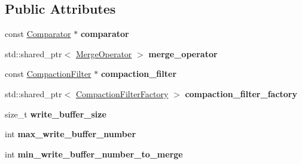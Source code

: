 \subsection*{Public Attributes}
\begin{DoxyCompactItemize}
\item 
const \hyperlink{classrocksdb_1_1Comparator}{Comparator} $\ast$ {\bfseries comparator}\hypertarget{structrocksdb_1_1ColumnFamilyOptions_adfb6e7d3c9eaa25910a00d5c3f62db4b}{}\label{structrocksdb_1_1ColumnFamilyOptions_adfb6e7d3c9eaa25910a00d5c3f62db4b}

\item 
std\+::shared\+\_\+ptr$<$ \hyperlink{classrocksdb_1_1MergeOperator}{Merge\+Operator} $>$ {\bfseries merge\+\_\+operator}\hypertarget{structrocksdb_1_1ColumnFamilyOptions_ac5b3c36f2f0f1bf0332b96a650747710}{}\label{structrocksdb_1_1ColumnFamilyOptions_ac5b3c36f2f0f1bf0332b96a650747710}

\item 
const \hyperlink{classrocksdb_1_1CompactionFilter}{Compaction\+Filter} $\ast$ {\bfseries compaction\+\_\+filter}\hypertarget{structrocksdb_1_1ColumnFamilyOptions_a8ad6299f938d7e2b1481e156f5caa04c}{}\label{structrocksdb_1_1ColumnFamilyOptions_a8ad6299f938d7e2b1481e156f5caa04c}

\item 
std\+::shared\+\_\+ptr$<$ \hyperlink{classrocksdb_1_1CompactionFilterFactory}{Compaction\+Filter\+Factory} $>$ {\bfseries compaction\+\_\+filter\+\_\+factory}\hypertarget{structrocksdb_1_1ColumnFamilyOptions_a52d9317b197ae0f29dfe5823c593a672}{}\label{structrocksdb_1_1ColumnFamilyOptions_a52d9317b197ae0f29dfe5823c593a672}

\item 
size\+\_\+t {\bfseries write\+\_\+buffer\+\_\+size}\hypertarget{structrocksdb_1_1ColumnFamilyOptions_a0bfb59ff9e6e6636b6bc41cec20c3835}{}\label{structrocksdb_1_1ColumnFamilyOptions_a0bfb59ff9e6e6636b6bc41cec20c3835}

\item 
int {\bfseries max\+\_\+write\+\_\+buffer\+\_\+number}\hypertarget{structrocksdb_1_1ColumnFamilyOptions_aabe9596603e4ce9e9e88ffb6317ebdf1}{}\label{structrocksdb_1_1ColumnFamilyOptions_aabe9596603e4ce9e9e88ffb6317ebdf1}

\item 
int {\bfseries min\+\_\+write\+\_\+buffer\+\_\+number\+\_\+to\+\_\+merge}\hypertarget{structrocksdb_1_1ColumnFamilyOptions_a01a476601097827a39b5d4c938b692b0}{}\label{structrocksdb_1_1ColumnFamilyOptions_a01a476601097827a39b5d4c938b692b0}


\end{DoxyCompactItemize}
